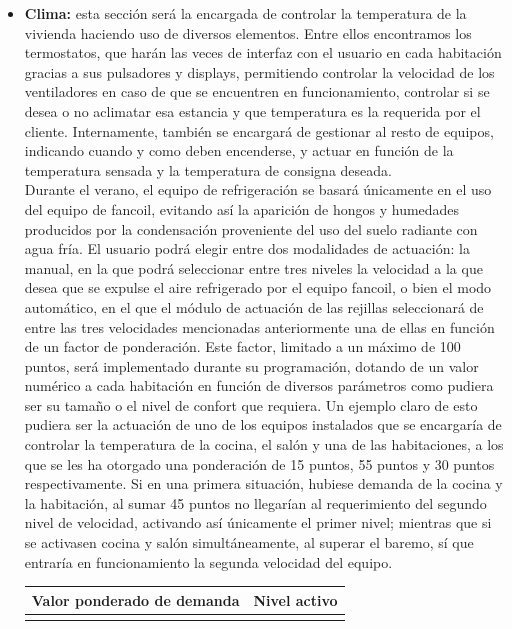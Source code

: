 \begin{itemize}
\item \textbf{Clima:} esta sección será la encargada de controlar la temperatura de la vivienda haciendo uso de diversos elementos. Entre ellos encontramos los termostatos, que harán las veces de interfaz con el usuario en cada habitación gracias a sus pulsadores y displays, permitiendo controlar la velocidad de los ventiladores en caso de que se encuentren en funcionamiento, controlar si se desea o no aclimatar esa estancia y que temperatura es la requerida por el cliente. Internamente, también se encargará de gestionar al resto de equipos, indicando cuando y como deben encenderse, y actuar en función de la temperatura sensada y la temperatura de consigna deseada. \\
Durante el verano, el equipo de refrigeración se basará únicamente en el uso del equipo de fancoil, evitando así la aparición de hongos y humedades producidos por la condensación proveniente del uso del suelo radiante con agua fría. El usuario podrá elegir entre dos modalidades de actuación: la manual, en la que podrá seleccionar entre tres niveles la velocidad a la que desea que se expulse el aire refrigerado por el equipo fancoil, o bien el modo automático, en el que el módulo de actuación de las rejillas seleccionará de entre las tres velocidades mencionadas anteriormente una de ellas en función de un factor de ponderación. Este factor, limitado a un máximo de 100 puntos, será implementado durante su programación, dotando de un valor numérico a cada habitación en función de diversos parámetros como pudiera ser su tamaño o el nivel de confort que requiera. Un ejemplo claro de esto pudiera ser la actuación de uno de los equipos instalados que se encargaría de controlar la temperatura de la cocina, el salón y una de las habitaciones, a los que se les ha otorgado una ponderación de 15 puntos, 55 puntos y 30 puntos respectivamente. Si en una primera situación, hubiese demanda de la cocina y la habitación, al sumar 45 puntos no llegarían al requerimiento del segundo nivel de velocidad, activando así únicamente el primer nivel; mientras que si se activasen cocina y salón simultáneamente, al superar el baremo, sí que entraría en funcionamiento la segunda velocidad del equipo.
\bigskip
\begin{table}[H]
\begin{center}
\begin{tabular}{| c | c |} \hline
\rule[0mm]{0mm}{6mm}
\textbf{Valor ponderado de demanda} & \textbf{Nivel activo} \\ \hline
\rule[0mm]{0mm}{4mm}

\end{tabular}
\end{center}
\end{table}
\end{itemize}
